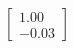 \documentclass[preview]{standalone}
\begin{document}
\begin{align*}
\begin{bmatrix} 1.00 \\ -0.03 \end{bmatrix}
\end{align*}
\end{document}
